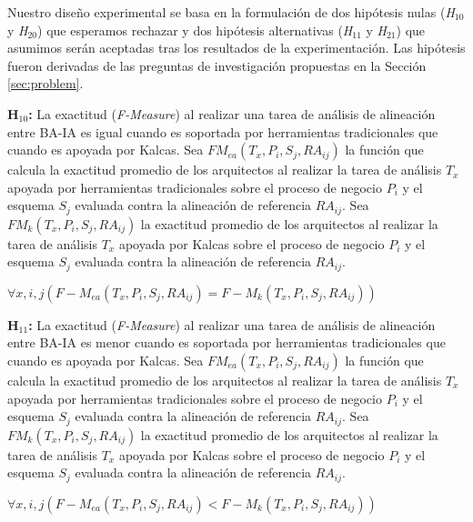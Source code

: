 Nuestro dise\~no experimental se basa en la formulaci\'on de dos hip\'otesis nulas (\textit{H$_{10}$} y \textit{H$_{20}$}) que esperamos rechazar y dos hip\'otesis alternativas (\textit{H$_{11}$} y \textit{H$_{21}$}) que asumimos ser\'an aceptadas tras los resultados de la experimentaci\'on. Las hip\'otesis fueron derivadas de las preguntas de investigaci\'on propuestas en la Secci\'on \ref{sec:problem}.

\textbf{H$_{10}$:} La exactitud (\textit{F-Measure}) al realizar una tarea de an\'alisis de alineaci\'on entre BA-IA es igual cuando es soportada por herramientas tradicionales que cuando es apoyada por Kalcas. Sea $FM_{ea}(T_{x}, P_{i},S_{j},RA_{ij})$ la funci\'on que calcula la exactitud promedio de los arquitectos al realizar la tarea de an\'alisis $T_{x}$ apoyada por herramientas tradicionales sobre el proceso de negocio $P_{i}$ y el esquema $S_{j}$ evaluada contra la alineaci\'on de referencia $RA_{ij}$. Sea $FM_{k}(T_{x}, P_{i},S_{j},RA_{ij})$ la exactitud promedio de los arquitectos al realizar la tarea de an\'alisis $T_{x}$ apoyada por Kalcas sobre el proceso de negocio $P_{i}$ y el esquema $S_{j}$ evaluada contra la alineaci\'on de referencia $RA_{ij}$.

\begin{center}
	\begin{math}
 \forall{x,i,j}(F-M_{ea}(T_{x}, P_{i},S_{j},RA_{ij}) = F-M_{k}(T_{x}, P_{i},S_{j},RA_{ij}))
	\end{math}
\end{center}


\textbf{H$_{11}$:} La exactitud (\textit{F-Measure}) al realizar una tarea de an\'alisis de alineaci\'on entre BA-IA es menor cuando es soportada por herramientas tradicionales que cuando es apoyada por Kalcas. Sea $FM_{ea}(T_{x}, P_{i},S_{j},RA_{ij})$ la funci\'on que calcula la exactitud promedio de los arquitectos al realizar la tarea de an\'alisis $T_{x}$ apoyada por herramientas tradicionales sobre el proceso de negocio $P_{i}$ y el esquema $S_{j}$ evaluada contra la alineaci\'on de referencia $RA_{ij}$. Sea $FM_{k}(T_{x}, P_{i},S_{j},RA_{ij})$ la exactitud promedio de los arquitectos al realizar la tarea de an\'alisis $T_{x}$ apoyada por Kalcas sobre el proceso de negocio $P_{i}$ y el esquema $S_{j}$ evaluada contra la alineaci\'on de referencia $RA_{ij}$.

\begin{center}
	\begin{math}
 \forall{x,i,j}(F-M_{ea}(T_{x}, P_{i},S_{j},RA_{ij}) < F-M_{k}(T_{x}, P_{i},S_{j},RA_{ij}))
	\end{math}
\end{center}


